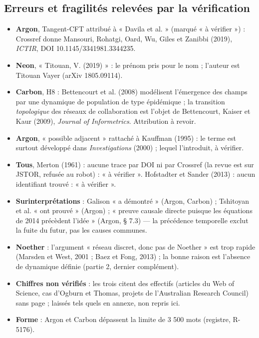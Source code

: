 \documentclass[a4paper,11pt]{article}
\begin{document}
\subsection{Erreurs et fragilités relevées par la vérification}
\begin{itemize}[itemsep=2pt]
\item \textbf{Argon}, Tangent-CFT attribué à « Davila et al. » (marqué « à vérifier ») : Crossref donne Mansouri, Rohatgi, Oard, Wu, Giles et Zanibbi (2019), \emph{ICTIR}, DOI 10.1145/3341981.3344235.
\item \textbf{Neon}, « Titouan, V. (2019) » : le prénom pris pour le nom ; l'auteur est Titouan Vayer (arXiv 1805.09114).
\item \textbf{Carbon}, H8 : Bettencourt et al. (2008) modélisent l'émergence des champs par une dynamique de population de type épidémique ; la transition \emph{topologique} des réseaux de collaboration est l'objet de Bettencourt, Kaiser et Kaur (2009), \emph{Journal of Informetrics}. Attribution à revoir.
\item \textbf{Argon}, « possible adjacent » rattaché à Kauffman (1995) : le terme est surtout développé dans \emph{Investigations} (2000) ; lequel l'introduit, à vérifier.
\item \textbf{Tous}, Merton (1961) : aucune trace par DOI ni par Crossref (la revue est sur JSTOR, refusée au robot) : « à vérifier ». Hofstadter et Sander (2013) : aucun identifiant trouvé : « à vérifier ».
\item \textbf{Surinterprétations} : Galison « a démontré » (Argon, Carbon) ; Tshitoyan et al. « ont prouvé » (Argon) ; « preuve causale directe puisque les équations de 2014 précèdent l'idée » (Argon, § 7.3) — la précédence temporelle exclut la fuite du futur, pas les causes communes.
\item \textbf{Noether} : l'argument « réseau discret, donc pas de Noether » est trop rapide (Marsden et West, 2001 ; Baez et Fong, 2013) ; la bonne raison est l'absence de dynamique définie (partie 2, dernier complément).
\item \textbf{Chiffres non vérifiés} : les trois citent des effectifs (articles du Web of Science, cas d'Ogburn et Thomas, projets de l'Australian Research Council) sans page ; laissés tels quels en annexe, non repris ici.
\item \textbf{Forme} : Argon et Carbon dépassent la limite de 3 500 mots (registre, R-5176).
\end{itemize}
\end{document}
